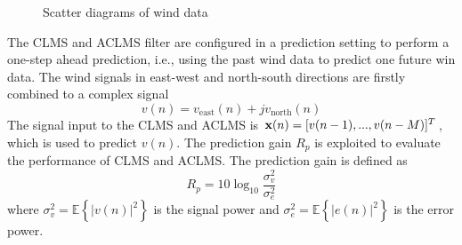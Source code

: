 \documentclass[10pt]{article}
\begin{document}
\begin{figure}[htbp]
    \centering
    \caption{Scatter diagrams of wind data}
    \label{fig17}
\end{figure}

The CLMS and ACLMS filter are configured in a prediction setting to perform a one-step ahead 
prediction, i.e., using the past wind data to predict one future win data. The wind signals 
in east-west and north-south directions are firstly combined to a complex signal
\begin{equation}
	v(n) = v_{\text{east}}(n) + j v_{\text{north}}(n)
\end{equation}
The signal input to the CLMS and ACLMS is ${\bf{x}}(n) = [v(n-1),...,v(n-M)]^T$, which is used to
predict $v(n)$. The prediction gain $R_p$ is exploited to evaluate the performance of CLMS and ACLMS.
The prediction gain is defined as
\begin{equation}
	R_p = 10 \log_{10} \frac{\sigma_v^2}{\sigma_e^2}
\end{equation}
where $\sigma_v^2 = \mathbb{E} \left\{ |v(n)|^2 \right\}$ is the signal power and $\sigma_e^2 = \mathbb{E} \left\{ |e(n)|^2 \right\}$ is the error power.
\end{document}
